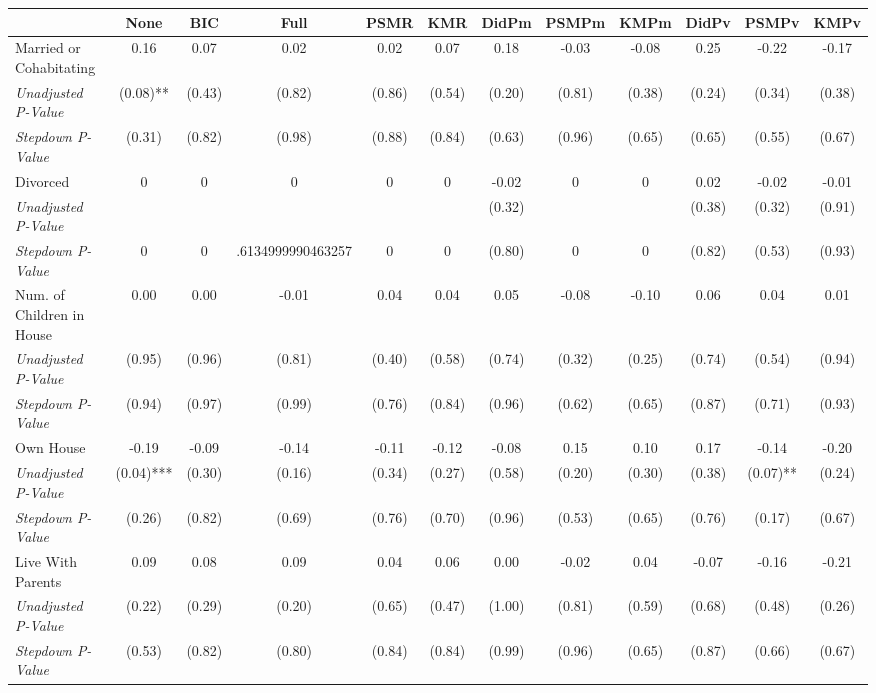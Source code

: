 \begin{tabular}{l c c c c c c c c c c c}
\toprule
 & None & BIC & Full & PSMR & KMR & DidPm & PSMPm & KMPm & DidPv & PSMPv & KMPv \\
\midrule
Married or Cohabitating & 0.16 & 0.07 & 0.02 & 0.02 & 0.07 & 0.18 & -0.03 & -0.08 & 0.25 & -0.22 & -0.17 \\
\quad \textit{Unadjusted P-Value} & (0.08)** & (0.43) & (0.82) & (0.86) & (0.54) & (0.20) & (0.81) & (0.38) & (0.24) & (0.34) & (0.38) \\
\quad \textit{Stepdown P-Value} & (0.31) & (0.82) & (0.98) & (0.88) & (0.84) & (0.63) & (0.96) & (0.65) & (0.65) & (0.55) & (0.67) \\
Divorced & 0 & 0 & 0 & 0 & 0 & -0.02 & 0 & 0 & 0.02 & -0.02 & -0.01 \\
\quad \textit{Unadjusted P-Value} & & & & & & (0.32) & & & (0.38) & (0.32) & (0.91) \\
\quad \textit{Stepdown P-Value} & 0 & 0 & .6134999990463257 & 0 & 0 & (0.80) & 0 & 0 & (0.82) & (0.53) & (0.93) \\
Num. of Children in House & 0.00 & 0.00 & -0.01 & 0.04 & 0.04 & 0.05 & -0.08 & -0.10 & 0.06 & 0.04 & 0.01 \\
\quad \textit{Unadjusted P-Value} & (0.95) & (0.96) & (0.81) & (0.40) & (0.58) & (0.74) & (0.32) & (0.25) & (0.74) & (0.54) & (0.94) \\
\quad \textit{Stepdown P-Value} & (0.94) & (0.97) & (0.99) & (0.76) & (0.84) & (0.96) & (0.62) & (0.65) & (0.87) & (0.71) & (0.93) \\
Own House & -0.19 & -0.09 & -0.14 & -0.11 & -0.12 & -0.08 & 0.15 & 0.10 & 0.17 & -0.14 & -0.20 \\
\quad \textit{Unadjusted P-Value} & (0.04)*** & (0.30) & (0.16) & (0.34) & (0.27) & (0.58) & (0.20) & (0.30) & (0.38) & (0.07)** & (0.24) \\
\quad \textit{Stepdown P-Value} & (0.26) & (0.82) & (0.69) & (0.76) & (0.70) & (0.96) & (0.53) & (0.65) & (0.76) & (0.17) & (0.67) \\
Live With Parents & 0.09 & 0.08 & 0.09 & 0.04 & 0.06 & 0.00 & -0.02 & 0.04 & -0.07 & -0.16 & -0.21 \\
\quad \textit{Unadjusted P-Value} & (0.22) & (0.29) & (0.20) & (0.65) & (0.47) & (1.00) & (0.81) & (0.59) & (0.68) & (0.48) & (0.26) \\
\quad \textit{Stepdown P-Value} & (0.53) & (0.82) & (0.80) & (0.84) & (0.84) & (0.99) & (0.96) & (0.65) & (0.87) & (0.66) & (0.67) \\
\bottomrule
\end{tabular}
